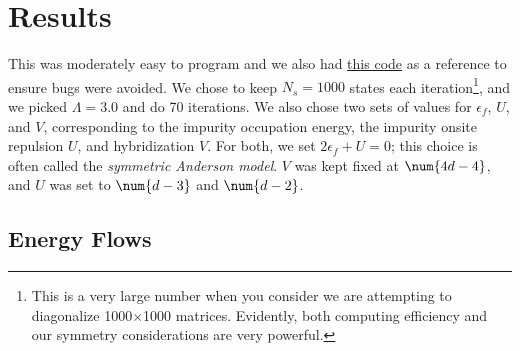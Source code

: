 \section{Results}

This was moderately easy to program and we also had \href{https://github.com/tatha04/Numerical-Renormalization-Group}{this code} as a reference to ensure bugs were avoided. We chose to keep $N_s = 1000$ states each iteration\footnote{This is a very large number when you consider we are attempting to diagonalize 1000$\times$1000 matrices. Evidently, both computing efficiency and our symmetry considerations are very powerful.}, and we picked $\Lambda=3.0$ and do 70 iterations. We also chose two sets of values for $\epsilon_f$, $U$, and $V$, corresponding to the impurity occupation energy, the impurity onsite repulsion $U$, and hybridization $V$. For both, we set $2\epsilon_f + U = 0$; this choice is often called the \textit{symmetric Anderson model}. $V$ was kept fixed at $\num{4d-4}$, and $U$ was set to $\num{d-3}$ and $\num{d-2}$.


\subsection{Energy Flows}


